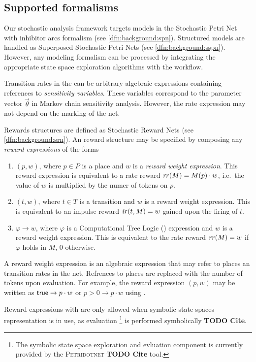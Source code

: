 \subsection{Supported formalisms}

Our stochastic analysis framework targets models in the Stochastic
Petri Net with inhibitor arcs formalism (see
\vref{dfn:background:spn}). Structured models are handled as
Superposed Stochastic Petri Nets (see
\vref{dfn:background:sspn}). However, any modeling formalism can be
processed by integrating the appropriate state space exploration
algorithms with the workflow.

Transition rates in the  can be arbitrary algebraic
expressions containing references to \emph{sensitivity
  variables}. These variables correspond to the parameter vector
$\vec{\theta}$ in Markov chain sensitivity analysis. However, the rate
expression may not depend on the marking of the net.

Rewards structures are defined as Stochastic Reward Nets (see
\vref{dfn:background:srn}). An  reward structure may be
specified by composing any \emph{reward expressions} of the forms
\begin{enumerate}
\item $(p, w)$, where $p \in P$ is a place and $w$ is a \emph{reward
    weight expression}. This reward expression is equivalent to
  a rate reward $\mathit{rr}(M) = M(p) \cdot w$, i.e.~the value of $w$
  is multiplied by the numer of tokens on $p$.
\item $(t, w)$, where $t \in T$ is a transition and $w$ is a reward
  weight expression. This is equivalent to an impulse reward
  $\mathit{ir}(t, M) = w$ gained upon the firing of $t$.
\item $\varphi \rightarrow w$, where $\varphi$ is a Computational Tree
  Logic () expression and $w$ is a reward weight
  expression. This is equivalent to the rate reward $\mathit{rr}(M) =
  w$ if $\varphi$ holds in $M$, $0$ otherwise.
\end{enumerate}

A reward weight expression is an algebraic expression that may refer
to places an transition rates in the net. Refrences to places are
replaced with the number of tokens upon evaluation. For example, the
reward expression $(p, w)$ may be written as
$\textsf{true} \rightarrow p \cdot w$ or $p > 0 \rightarrow p \cdot w$ using
.

Reward expressions with  are only allowed when symbolic
state spaces representation is in use, as  evaluation%
\footnote{The symbolic state space exploration and 
  evluation component is currently provided by the
  \textsc{Petridotnet} \textbf{TODO Cite} tool.} is performed
symbolically \textbf{TODO Cite}.

